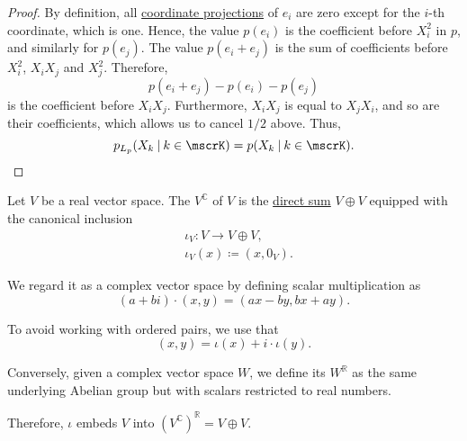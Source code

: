 \begin{proof}
  By definition, all \hyperref[def:basis_decomposition]{coordinate projections} of \( e_i \) are zero except for the \( i \)-th coordinate, which is one. Hence, the value \( p(e_i) \) is the coefficient before \( X_i^2 \) in \( p \), and similarly for \( p(e_j) \). The value \( p(e_i + e_j) \) is the sum of coefficients before \( X_i^2 \), \( X_i X_j \) and \( X_j^2 \). Therefore,
  \begin{equation*}
    p(e_i + e_j) - p(e_i) - p(e_j)
  \end{equation*}
  is the coefficient before \( X_i X_j \). Furthermore, \( X_i X_j \) is equal to \( X_j X_i \), and so are their coefficients, which allows us to cancel \( 1 / 2 \) above. Thus,
  \begin{equation*}
    p_{L_p}(X_k \given k \in \mscrK) = p(X_k \given k \in \mscrK).
  \end{equation*}
\end{proof}

\begin{definition}\label{def:complexification}
  Let \( V \) be a real vector space. The  \( V^\BbbC \) of \( V \) is the \hyperref[def:semimodule_direct_sum]{direct sum} \( V \oplus V \) equipped with the canonical inclusion
  \begin{equation*}
    \begin{aligned}
      &\iota_V: V \to V \oplus V, \\
      &\iota_V(x) \coloneqq (x, 0_V).
    \end{aligned}
  \end{equation*}

  We regard it as a complex vector space by defining scalar multiplication as
  \begin{equation*}
    (a + bi) \cdot (x, y) = (ax - by, bx + ay).
  \end{equation*}

  To avoid working with ordered pairs, we use that
  \begin{equation*}
    (x, y) = \iota(x) + i \cdot \iota(y).
  \end{equation*}

  Conversely, given a complex vector space \( W \), we define its  \( W^\BbbR \) as the same underlying Abelian group but with scalars restricted to real numbers.

  Therefore, \( \iota \) embeds \( V \) into \( (V^\BbbC)^\BbbR = V \oplus V \).
\end{definition}

